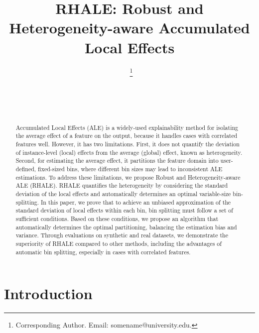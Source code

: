 \documentclass{ecai}  %
\begin{document}
\begin{frontmatter}

\title{RHALE: Robust and Heterogeneity-aware Accumulated Local Effects}

\author[A]{~\thanks{Corresponding Author. Email: somename@university.edu.}}
\author[B]{~}
\author[B]{~} %


\address[A]{Short Affiliation of First Author}
\address[B]{Short Affiliation of Second Author and Third Author}

\begin{abstract}
Accumulated Local Effects (ALE) is a widely-used explainability method for isolating the average effect of a feature on the output, because it handles cases with correlated features well. However, it has two limitations. First, it does not quantify the deviation of instance-level (local) effects from the average (global) effect, known as heterogeneity. Second, for estimating the average effect, it partitions the feature domain into user-defined, fixed-sized bins, where different bin sizes may lead to inconsistent ALE estimations. To address these limitations, we propose Robust and Heterogeneity-aware ALE (RHALE). RHALE quantifies the heterogeneity by considering the standard deviation of the local effects and automatically determines an optimal variable-size bin-splitting. In this paper, we prove that to achieve an unbiased approximation of the standard deviation of local effects within each bin, bin splitting must follow a set of sufficient conditions. Based on these conditions, we propose an algorithm that automatically determines the optimal partitioning, balancing the estimation bias and variance. Through evaluations on synthetic and real datasets, we demonstrate the superiority of RHALE compared to other methods, including the advantages of automatic bin splitting, especially in cases with correlated features.
\end{abstract}

\end{frontmatter}

\section{Introduction}
\label{sec:intro}
\end{document}
